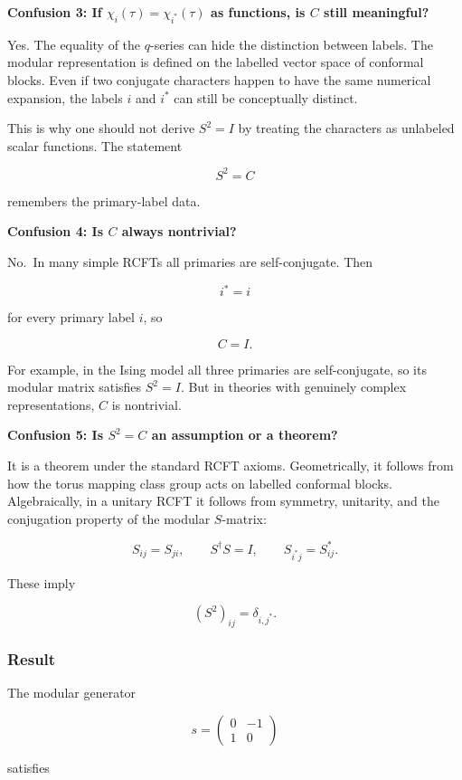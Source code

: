 \documentclass[
  10pt,
  a4paper,
  openany]{book}
\begin{document}
\textbf{Confusion 3: If \(\chi_i(\tau)=\chi_{i^*}(\tau)\) as functions,
is \(C\) still meaningful?}

Yes. The equality of the \(q\)-series can hide the distinction between
labels. The modular representation is defined on the labelled vector
space of conformal blocks. Even if two conjugate characters happen to
have the same numerical expansion, the labels \(i\) and \(i^*\) can
still be conceptually distinct.

This is why one should not derive \(S^2=I\) by treating the characters
as unlabeled scalar functions. The statement

\[
S^2=C
\]

remembers the primary-label data.

\textbf{Confusion 4: Is \(C\) always nontrivial?}

No.~In many simple RCFTs all primaries are self-conjugate. Then

\[
i^*=i
\]

for every primary label \(i\), so

\[
C=I.
\]

For example, in the Ising model all three primaries are self-conjugate,
so its modular matrix satisfies \(S^2=I\). But in theories with
genuinely complex representations, \(C\) is nontrivial.

\textbf{Confusion 5: Is \(S^2=C\) an assumption or a theorem?}

It is a theorem under the standard RCFT axioms. Geometrically, it
follows from how the torus mapping class group acts on labelled
conformal blocks. Algebraically, in a unitary RCFT it follows from
symmetry, unitarity, and the conjugation property of the modular
\(S\)-matrix:

\[
S_{ij}=S_{ji},
\qquad
S^\dagger S=I,
\qquad
S_{i^*j}=S_{ij}^*.
\]

These imply

\[
(S^2)_{ij}
=
\delta_{i,j^*}.
\]

\subsubsection{Result}\label{result-3}

The modular generator

\[
s=
\begin{pmatrix}
0 & -1 \\
1 & 0
\end{pmatrix}
\]

satisfies
\end{document}
